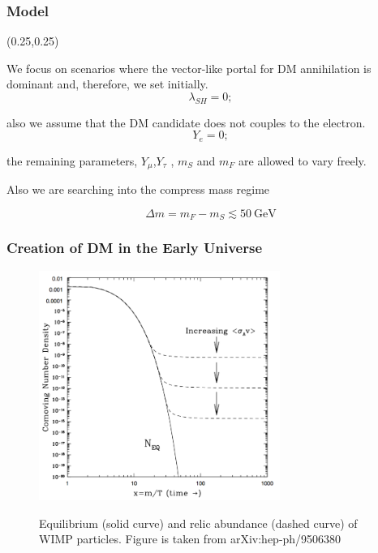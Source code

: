 \documentclass{beamer}
\numberwithin{figure}{section}
\begin{document}
\begin{frame}
\frametitle{Model}

\begin{textblock*}{1\linewidth}(0.25\linewidth,0.25\linewidth) %
	{\justify

	We focus on scenarios where the vector-like portal for DM annihilation is dominant and, therefore, we set initially.
	\begin{equation}\nonumber
	\lambda_{SH}=0;
	\end{equation}
	 
	also we assume that the DM candidate does not couples to the electron.
	\begin{equation}\nonumber
	Y_{e}=0;
	\end{equation}
	
	the remaining parameters, $Y_{\mu}$,$Y_{\tau}$ ,  $m_S$ and  $m_F$ are allowed to vary freely.
	
	Also we are searching into the compress mass regime 
	
		\begin{equation}\nonumber
		 \Delta m=m_{F}-m_S\lesssim 50\ \text{GeV}
		\end{equation}
	}
\end{textblock*}


\end{frame}

\begin{frame}
\frametitle{Creation of DM in the Early Universe}

\begin{figure}[!tbp]
	\centering
	\includegraphics[width=0.7\textwidth]{pictures/FrizzOut}\label{fig2}
	\caption{{\scriptsize Equilibrium (solid curve) and relic abundance (dashed curve) of WIMP particles. Figure is taken from 	arXiv:hep-ph/9506380}}
	
\end{figure}

\end{frame}
\end{document}
